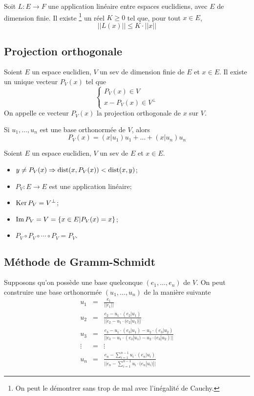 \begin{myprop}
	Soit $L : E \to F$ une application linéaire entre espaces euclidiens, avec $E$ de dimension finie.
	Il existe
	\footnote{On peut le démontrer sans trop de mal avec l'inégalité de Cauchy.}
	un réel $K \geq 0$ tel que, pour tout $x \in E$,
	\[ ||L(x)|| \leq K \cdot ||x|| \]
\end{myprop}

\subsection{Projection orthogonale}
\begin{mytheo}
	Soient $E$ un espace euclidien, $V$ un sev de dimension finie de $E$ et $x \in E$.
	Il existe un unique vecteur $P_V(x)$ tel que
	\[
	\left\{
	\begin{array}{l}
		P_V(x) \in V\\
		x - P_V(x) \in V^{\perp}
	\end{array}
	\right.
	\]
	On appelle ce vecteur $P_V(x)$ la projection orthogonale de $x$ sur $V$.

	Si $u_1, \ldots, u_n$ est une base orthonormée de $V$, alors
	\[ P_V(x) = (x|u_1)u_1 + \ldots + (x|u_n)u_n \]
\end{mytheo}

\begin{myprop}
	Soient $E$ un espace euclidien, $V$ un sev de $E$ et $x \in E$.
	\begin{itemize}
		\item $y \neq P_V(x) \Rightarrow \operatorname{dist}(x, P_V(x)) < \operatorname{dist}(x, y)$;
		\item $P_V : E \to E$ est une application linéaire;
		\item $\operatorname{Ker} P_V = V^{\perp}$;
		\item $\operatorname{Im} P_V = V = \{x \in E | P_V(x) = x\}$;
		\item $P_V \circ P_V \circ \cdots \circ P_V = P_V$.
	\end{itemize}
\end{myprop}

\subsection{Méthode de Gramm-Schmidt}

Supposons qu'on possède une base quelconque $(e_1, \dots , e_n)$ de $V$.
On peut construire une base orthonormée $(u_1, \dots, u_n)$ de la manière suivante
\begin{eqnarray*}
	u_1 &=& \frac{e_1}{||e_1||}\\
	u_2 &=& \frac{e_2 - u_1 \cdot (e_2|u_1)}{||e_2 - u_1 \cdot (e_2|u_1)||}\\
	u_3 &=& \frac{e_3 - u_1 \cdot (e_3|u_1) - u_2 \cdot (e_3|u_2)}{||e_3 - u_1 \cdot (e_3|u_1) - u_2 \cdot (e_3|u_2)||}\\
	\vdots &=& \vdots\\
	u_n &=& \frac{e_n - \sum_{i=1}^{n-1} u_i \cdot (e_n|u_i) }{ || e_n - \sum_{i=1}^{n-1} u_i \cdot (e_n|u_i) || }
\end{eqnarray*}

